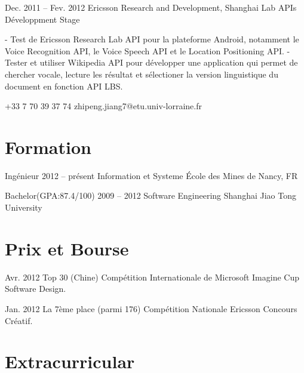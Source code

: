 \documentclass{tccv}
\begin{document}
\begin{eventlist}
\item{Dec. 2011 -- Fev. 2012}
     {Ericsson Research and Development, Shanghai}
     {Lab APIs Développment Stage}

- Test de Ericsson Research Lab API pour la plateforme Android, notamment le Voice Recognition API, le Voice Speech API et le Location Positioning API.
\newline
- Tester et utiliser Wikipedia API pour développer une application qui permet de chercher vocale, lecture les résultat et sélectioner la version linguistique du document en fonction API LBS.

\end{eventlist}

    {+33 7 70 39 37 74}
    {zhipeng.jiang7@etu.univ-lorraine.fr}

\section{Formation}

\begin{yearlist}

\item[Ingénieur]{2012 -- présent}
     {Information et Systeme}
     {École des Mines de Nancy, FR}

\item[Bachelor(GPA:87.4/100)]{2009 -- 2012}
     {Software Engineering}
     {Shanghai Jiao Tong University}

\end{yearlist}

\section{Prix et Bourse}

\begin{yearlist}

\item{Avr. 2012}
     {Top 30 (Chine)}
     {Compétition Internationale de Microsoft Imagine Cup Software Design.}
     
\item{Jan. 2012}
     {La 7ème place (parmi 176)}
     {Compétition Nationale Ericsson Concours Créatif.}

\end{yearlist}

\section{Extracurricular}
\end{document}
